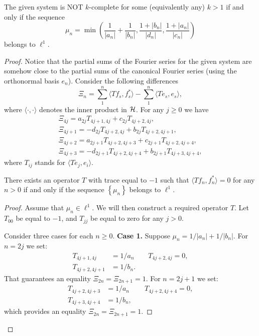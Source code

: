 \documentclass[12pt]{amsart}
\theoremstyle{case}
\begin{document}
  \begin{theorem}
      The given system is NOT $k$-complete for some (equivalently any) $k > 1$ if and only if the sequence
      \[
        \mu_n = \min\left(\frac{1}{|a_n|} + \frac{1}{|b_n|}, \frac{1 + |b_n|}{|d_n|}, \frac{1 + |a_n|}{|c_n|}\right)
      \]
        belongs to $\ell^1$.
  \end{theorem}
  \begin{proof}
    Notice that the partial sums of the Fourier series for the given system are somehow close to the
      partial sums of the canonical Fourier series (using the orthonormal basis $e_n$).
    Consider the following differences
    \[
      \Xi_n = \sum_1^n \langle Tf_s, f_s^* \rangle - \sum_1^n \langle Te_s, e_s \rangle,
    \]
      where $\langle \cdot, \cdot\rangle$ denotes the inner product in $\cal{H}$.
    For any $j \geq 0$ we have
    \begin{align*}
      \Xi_{4j} = a_{2j} T_{4j+1, 4j} + c_{2j} T_{4j+2, 4j},\\
      \Xi_{4j + 1} = -d_{2j} T_{4j+2, 4j} + b_{2j} T_{4j+2, 4j+1},\\
      \Xi_{4j + 2} = a_{2j+1} T_{4j+2, 4j+3} + c_{2j+1} T_{4j+2, 4j+4},\\
      \Xi_{4j + 3} = -d_{2j+1} T_{4j+2, 4j+4} + b_{2j+1} T_{4j+3, 4j+4},
    \end{align*}
    where $T_{ij}$ stands for $\langle Te_j, e_i \rangle$.
    \begin{prop}
      \label{inf-dim-statement}
      There exists an operator $T$ with trace equal to $-1$ such that $\langle Tf_n, f_n^*\rangle = 0$ for any $n > 0$
        if and only if the sequence $\left\{\mu_n\right\}$ belongs to $\ell^1$.
    \end{prop}
    \begin{proof}
      Assume that $\mu_n \in \ell^1$.
      We will then construct a required operator $T$.
      Let $T_{00}$ be equal to $-1$, and $T_{jj}$ be equal to zero for any $j > 0$.

      Consider three cases for each $n \geq 0$.
      \noindent\textbf{Case 1.} Suppose $\mu_n = 1/|a_n| + 1/|b_n|$.
      For $n=2j$ we set:
      \begin{align*}
        T_{4j+1,4j}&=1/a_n & \quad T_{4j+2,4j} = 0,\\
        T_{4j+2,4j+1}&=1/b_n.
      \end{align*}
      That guarantees an equality $\Xi_{2n} = \Xi_{2n+1} = 1$.
      For $n=2j+1$ we set:
      \begin{align*}
        T_{4j+2,4j+3}&=1/a_n & \quad T_{4j+2,4j+4} = 0,\\
        T_{4j+3,4j+4}&=1/b_n,
      \end{align*}
      which provides an equality $\Xi_{2n} = \Xi_{2n+1} = 1$.


\end{proof}
\end{proof}
\end{document}

